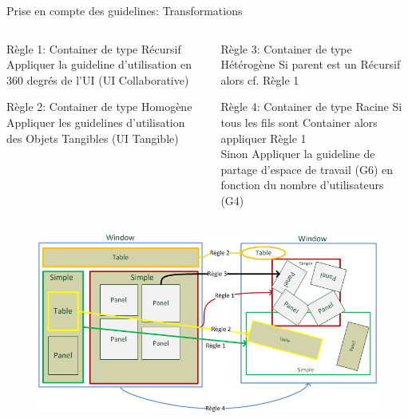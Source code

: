 \documentclass[11pt]{beamer}
\begin{document}
\begin{frame}[t]{{\small Prise en compte des guidelines: Transformations} } %
\begin{columns}
\begin{column}{.5\textwidth}
\begin{block}{{\tiny Règle 1: Container de type Récursif}}
{\tiny Appliquer la guideline d'utilisation en 360 degrés de l'UI (UI Collaborative)  }
\end{block}
\pause
\begin{block}{{\tiny Règle 2: Container de type Homogène}}
{\tiny Appliquer les guidelines d'utilisation des Objets Tangibles (UI Tangible)  }
\end{block}
\pause
\end{column}

\begin{column}{.5\textwidth}
\begin{block}{{\tiny Règle 3: Container de type Hétérogène}}
{\tiny Si parent est un Récursif alors cf. Règle 1}
\end{block}
\pause
\begin{block}{{\tiny Règle 4: Container de type Racine}}
{\tiny Si tous les fils sont Container alors appliquer Règle 1\\}
{\tiny Sinon Appliquer la guideline de partage d'espace de travail (G6) en fonction du nombre d'utilisateurs (G4)}
\end{block}
\end{column}
\end{columns}
\begin{figure}[t]
\begin{center}
\includegraphics[scale=.27]{./img/transforule}
\end{center}
\end{figure}


\end{frame}
\end{document}
